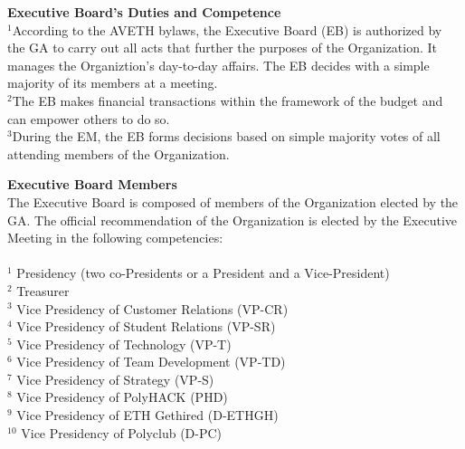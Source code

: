 \documentclass[10pt]{article}
\newcounter{qcounter}
\begin{document}
\begin{list}{{\bf Article :~}}{}
\item {\bf Executive Board's Duties and Competence}\label{EB}\\
$^{1}$According to the AVETH bylaws, the Executive Board (EB) is authorized by the GA to carry out all acts that further the purposes of the Organization. It manages the Organiztion's day-to-day affairs. The EB decides with a simple majority of its members at a meeting.\\
$^{2}$The EB makes financial transactions within the framework of the budget and can empower others to do so.\\
$^{3}$During the EM, the EB forms decisions based on simple majority votes of all attending members of the Organization.

\item {\bf Executive Board Members}\\
The Executive Board is composed of members of the Organization elected by the GA. The official recommendation of the Organization is elected by the Executive Meeting in the following competencies:\\ \\
$^{1}$ Presidency (two co-Presidents or a President and a Vice-President)\\
$^{2}$ Treasurer\\
$^{3}$ Vice Presidency of Customer Relations (VP-CR)\\
$^{4}$ Vice Presidency of Student Relations (VP-SR)\\
$^{5}$ Vice Presidency of Technology (VP-T)\\
$^{6}$ Vice Presidency of Team Development (VP-TD)\\
$^{7}$ Vice Presidency of Strategy (VP-S)\\
$^{8}$ Vice Presidency of PolyHACK (PHD)\\
$^{9}$ Vice Presidency of ETH Gethired (D-ETHGH)\\
$^{10}$ Vice Presidency of Polyclub (D-PC)\\\\


\end{list}
\end{document}
